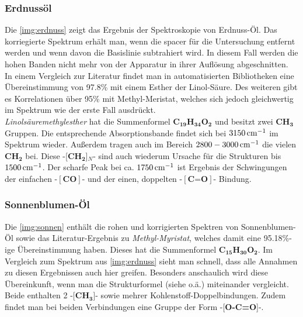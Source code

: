 \documentclass[a4paper,10pt,twocolumn]{article}
\newcommand{\tilt}[1]{\textit{#1}}
\newcommand{\fett}[1]{\textbf{#1}}
\begin{document}
		\subsubsection*{Erdnuss\"ol}

		Die \autoref{img:erdnuss} zeigt das Ergebnis der Spektroskopie von Erdnuss-\"Ol. Das korriegierte Spektrum erh\"alt man, wenn die spacer f\"ur die Untersuchung entfernt werden und wenn davon die Basislinie subtrahiert wird. In diesem Fall werden die hohen Banden nicht mehr von der Apparatur in ihrer Aufl\"osung abgeschnitten.\\
		In einem Vergleich zur Literatur findet man in automatisierten Bibliotheken eine \"Ubereinstimmung von 97.8\% mit einem Esther der Linol-S\"aure. Des weiteren gibt es Korrelationen \"uber 95\% mit Methyl-Meristat, welches sich jedoch gleichwertig im Spektrum wie der erste Fall ausdr\"uckt.\\
		\tilt{Linols\"auremethylesther} hat die Summenformel \fett{C}$_{\fett{19}}$\fett{H}$_{\fett{34}}$\fett{O}$_{\fett{2}}$ und besitzt zwei \fett{CH}$_{\fett{3}}$ Gruppen. Die entsprechende Absorptionsbande findet sich bei $\unit[3150]{cm^{-1}}$ im Spektrum wieder. Au{\ss}erdem tragen auch im Bereich $\unit[2800-3000]{cm^{-1}}$ die vielen \fett{CH}$_{\fett{2}}$ bei. Diese -[\fett{CH}$_{\fett{2}}$]$_{N}$- sind auch wiederum Ursache f\"ur die Strukturen bis $\unit[1500]{cm^{-1}}$. Der scharfe Peak bei ca. $\unit[1750]{cm^{-1}}$ ist Ergebnis der Schwingungen der einfachen -$[\fett{CO}]$- und der einen, doppelten -$[\fett{C=O}]$- Bindung.
		
		\subsubsection*{Sonnenblumen-\"Ol}

		Die \autoref{img:sonnen} enth\"alt die rohen und korrigierten Spektren von Sonnenblumen-\"Ol sowie das Literatur-Ergebnis zu \tilt{Methyl-Myristat}, welches damit eine 95.18\%-ige \"Ubereinstimmung haben. Dieses hat die Summenformel \fett{C}$_{\fett{15}}$\fett{H}$_{\fett{30}}$\fett{O}$_{\fett{2}}$. Im Vergleich zum Spektrum aus \autoref{img:erdnuss} sieht man schnell, dass alle Annahmen zu diesen Ergebnissen auch hier greifen. Besonders anschaulich wird diese \"Ubereinkunft, wenn man die Strukturformel (siehe \cite{FTIRStruk} o.\"a.) miteinander vergleicht. Beide enthalten 2 -[\fett{CH}$_{\fett{3}}$]- sowie mehrer Kohlenstoff-Doppelbindungen. Zudem findet man bei beiden Verbindungen eine Gruppe der Form -[\fett{O-C=O}]-.
\end{document}
